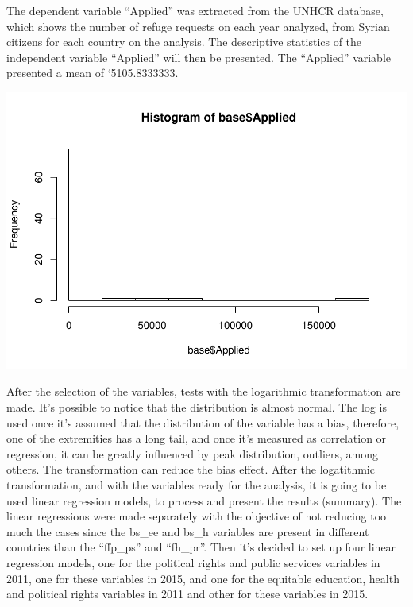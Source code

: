 \documentclass[]{elsarticle} %
\makeatletter
\def\maxwidth{\ifdim\Gin@nat@width>\linewidth\linewidth
\else\Gin@nat@width\fi}
\let\Oldincludegraphics\includegraphics
\renewcommand{\includegraphics}[1]{\Oldincludegraphics[width=\maxwidth]{#1}}
\makeatother
\begin{document}
The dependent variable ``Applied'' was extracted from the UNHCR
database, which shows the number of refuge requests on each year
analyzed, from Syrian citizens for each country on the analysis. The
descriptive statistics of the independent variable ``Applied'' will then
be presented. The ``Applied'' variable presented a mean of
`5105.8333333.

\includegraphics{stephanie-moura-rmarkdown-tf-ad-ufpe-2018_files/figure-latex/histo_1-1.pdf}

After the selection of the variables, tests with the logarithmic
transformation are made. It's possible to notice that the distribution
is almost normal. The log is used once it's assumed that the
distribution of the variable has a bias, therefore, one of the
extremities has a long tail, and once it's measured as correlation or
regression, it can be greatly influenced by peak distribution, outliers,
among others. The transformation can reduce the bias effect. After the
logatithmic transformation, and with the variables ready for the
analysis, it is going to be used linear regression models, to process
and present the results (summary). The linear regressions were made
separately with the objective of not reducing too much the cases since
the bs\_ee and bs\_h variables are present in different countries than
the ``ffp\_ps'' and ``fh\_pr''. Then it's decided to set up four linear
regression models, one for the political rights and public services
variables in 2011, one for these variables in 2015, and one for the
equitable education, health and political rights variables in 2011 and
other for these variables in 2015.
\end{document}
